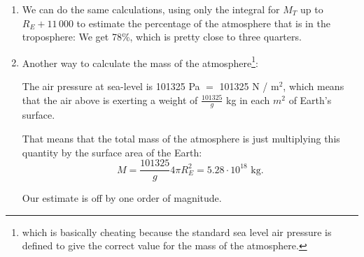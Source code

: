 \begin{enumerate}
\begin{enumerate}
\item We can do the same calculations, using only the integral for $M_T$ up to $R_E+11\,000$ to  estimate the percentage of the atmosphere that is in the troposphere: We get 78\%, which is  pretty close to three quarters.

\item Another way to calculate the mass of the atmosphere\footnote{which is basically cheating because the standard sea level air pressure is defined to give the correct value for the mass of the atmosphere.}:

The air pressure at sea-level is 101325 Pa $=$ 101325 N / m$^2$, which means that the air above is exerting a weight of $ \frac{101325}{g}$ kg in each $m^2$ of Earth's surface.

That means that the total mass of the atmosphere is just multiplying this quantity by the surface area of the Earth:
\[
M = \frac{101325}{g} 4 \pi R_E^2 = 5.28 \cdot 10^{18} \text{ kg}.
\]

Our estimate is off by one order of magnitude.


\end{enumerate}


\newpage

%
%
%
%

\end{enumerate}
	
